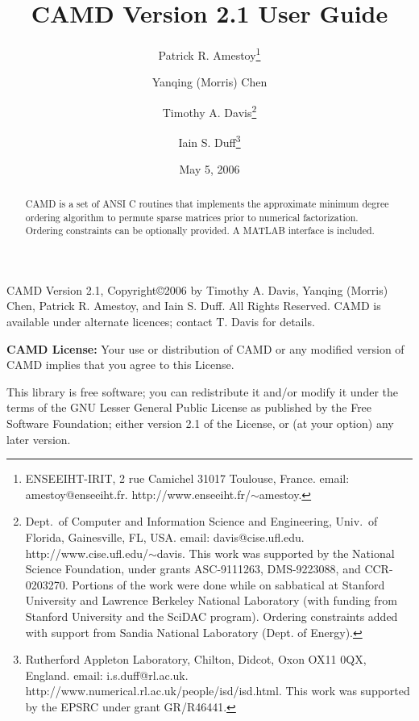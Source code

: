 \documentclass[11pt]{article}
\begin{document}

\title{CAMD Version 2.1 User Guide}
\author{Patrick R. Amestoy\thanks{ENSEEIHT-IRIT,
2 rue Camichel 31017 Toulouse, France.
email: amestoy@enseeiht.fr.  http://www.enseeiht.fr/$\sim$amestoy.}
\and Yanqing (Morris) Chen
\and Timothy A. Davis\thanks{
Dept.~of Computer and Information Science and Engineering,
Univ.~of Florida, Gainesville, FL, USA.
email: davis@cise.ufl.edu.
http://www.cise.ufl.edu/$\sim$davis.
This work was supported by the National
Science Foundation, under grants ASC-9111263, DMS-9223088, and CCR-0203270.
Portions of the work were done while on sabbatical at Stanford University
and Lawrence Berkeley National Laboratory (with funding from Stanford
University and the SciDAC program).  Ordering constraints added with
support from Sandia National Laboratory (Dept. of Energy).
}
\and Iain S. Duff\thanks{Rutherford Appleton Laboratory, Chilton, Didcot, 
Oxon OX11 0QX, England. email: i.s.duff@rl.ac.uk.  
http://www.numerical.rl.ac.uk/people/isd/isd.html.
This work was supported by the EPSRC under grant GR/R46441.
}}

\date{May 5, 2006}
\maketitle

\begin{abstract}
CAMD is a set of ANSI C routines that implements the approximate minimum degree
ordering algorithm to permute sparse matrices prior to
numerical factorization.  Ordering constraints can be optionally provided.
A MATLAB interface is included.
\end{abstract}

CAMD Version 2.1, Copyright\copyright 2006 by Timothy A.  Davis,
Yanqing (Morris) Chen,
Patrick R. Amestoy, and Iain S. Duff.  All Rights Reserved.
CAMD is available under alternate licences; contact T. Davis for details.

{\bf CAMD License:}
    Your use or distribution of CAMD or any modified version of
    CAMD implies that you agree to this License.

    This library is free software; you can redistribute it and/or
    modify it under the terms of the GNU Lesser General Public
    License as published by the Free Software Foundation; either
    version 2.1 of the License, or (at your option) any later version.
\end{document}
